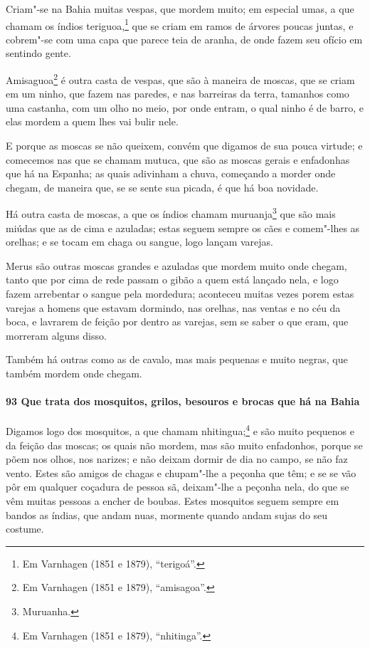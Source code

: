 Criam"-se na Bahia muitas vespas, que mordem muito; em especial umas, a que chamam os
índios teriguoa,\footnote{ Em Varnhagen (1851 e 1879), ``terigoá''.} que se criam em ramos
de árvores poucas juntas, e cobrem"-se com uma capa que parece teia de aranha, de onde
fazem seu ofício em sentindo gente.

Amisaguoa\footnote{ Em Varnhagen (1851 e 1879), ``amisagoa''.} é outra casta de vespas,
que são à maneira de moscas, que se criam em um ninho, que fazem nas paredes, e nas
barreiras da terra, tamanhos como uma castanha, com um olho no meio, por onde entram, o
qual ninho é de barro, e elas mordem a quem lhes vai bulir nele.

E porque as moscas se não queixem, convém que digamos de sua pouca virtude; e comecemos
nas que se chamam mutuca, que são as moscas gerais e enfadonhas que há na Espanha; as
quais adivinham a chuva, começando a morder onde chegam, de maneira que, se se sente sua
picada, é que há boa novidade.

Há outra casta de moscas, a que os índios chamam muruanja\footnote{ Muruanha.} que são
mais miúdas que as de cima e azuladas; estas seguem sempre os cães e comem"-lhes as
orelhas; e se tocam em chaga ou sangue, logo lançam varejas.

Merus são outras moscas grandes e azuladas que mordem muito onde chegam, tanto que por
cima de rede passam o gibão a quem está lançado nela, e logo fazem arrebentar o sangue
pela mordedura; aconteceu muitas vezes porem estas varejas a homens que estavam dormindo,
nas orelhas, nas ventas e no céu da boca, e lavrarem de feição por dentro as varejas, sem
se saber o que eram, que morreram alguns disso.

Também há outras como as de cavalo, mas mais pequenas e muito negras, que também mordem
onde chegam.

\paragraph{93 Que trata dos mosquitos, grilos, besouros e brocas que há na Bahia}

Digamos logo dos mosquitos, a que chamam nhitingua;\footnote{ Em Varnhagen (1851 e 1879),
``nhitinga''.} e são muito pequenos e da feição das moscas; os quais não mordem, mas são
muito enfadonhos, porque se põem nos olhos, nos narizes; e não deixam dormir de dia no
campo, se não faz vento. Estes são amigos de chagas e chupam"-lhe a peçonha que têm; e se
se vão pôr em qualquer coçadura de pessoa sã, deixam"-lhe a peçonha nela, do que se vêm
muitas pessoas a encher de boubas. Estes mosquitos seguem sempre em bandos as índias, que
andam nuas, mormente quando andam sujas do seu costume.

